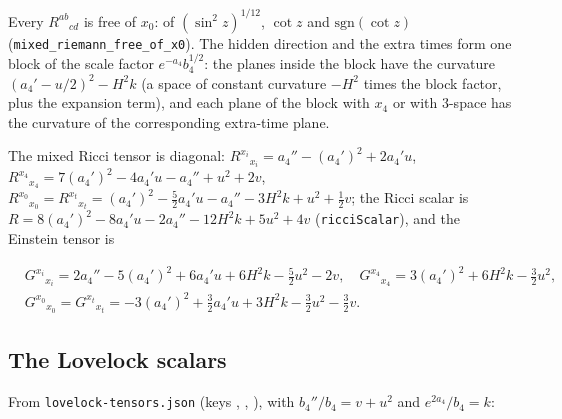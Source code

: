 \documentclass[11pt]{article}
\begin{document}
Every $R^{ab}{}_{cd}$ is free of $x_0$: of $(\sin^2z)^{1/12}$, $\cot z$ and $\mathrm{sgn}(\cot z)$ (\texttt{mixed\_ri\allowbreak{}emann\_fr\allowbreak{}ee\_of\_x0}). The hidden direction and the extra times form one block of the scale factor $e^{-a_4}b_4^{1/2}$: the planes inside the block have the curvature $(a_4' - u/2)^2 - H^2k$ (a space of constant curvature $-H^2$ times the block factor, plus the expansion term), and each plane of the block with $x_4$ or with 3-space has the curvature of the corresponding extra-time plane.

The mixed Ricci tensor is diagonal: $R^{x_i}{}_{x_i} = a_4'' - (a_4')^2 + 2a_4'u$, $R^{x_4}{}_{x_4} = 7(a_4')^2 - 4a_4'u - a_4'' + u^2 + 2v$, $R^{x_0}{}_{x_0} = R^{x_t}{}_{x_t} = (a_4')^2 - \frac52a_4'u - a_4'' - 3H^2k + u^2 + \frac12v$; the Ricci scalar is $R = 8(a_4')^2 - 8a_4'u - 2a_4'' - 12H^2k + 5u^2 + 4v$ (\texttt{ricciSca\allowbreak{}lar}), and the Einstein tensor is

\[
\begin{aligned}
&G^{x_i}{}_{x_i} = 2a_4'' - 5(a_4')^2 + 6a_4'u + 6H^2k - \tfrac52u^2 - 2v,\quad G^{x_4}{}_{x_4} = 3(a_4')^2 + 6H^2k - \tfrac32u^2,\\
&G^{x_0}{}_{x_0} = G^{x_t}{}_{x_t} = -3(a_4')^2 + \tfrac32a_4'u + 3H^2k - \tfrac32u^2 - \tfrac32v .
\end{aligned}
\]

\subsection{The Lovelock scalars}

From \texttt{lovelock\allowbreak{}-tensors\allowbreak{}.json} (keys \texttt{}, \texttt{}, \texttt{}), with $b_4''/b_4 = v + u^2$ and $e^{2a_4}/b_4 = k$:
\end{document}
